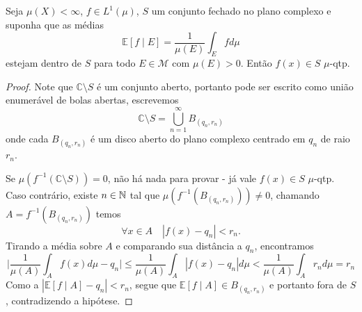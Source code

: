 \begin{problem}
    \label{prob:l6:2}
    Seja $\mu(X) < \infty$, $f \in L^1(\mu)$, $S$ um conjunto fechado no plano complexo e suponha que as médias
    $$\mathbb{E}[f \mid E] = \frac{1}{\mu(E)} \int_E fd\mu$$
    estejam dentro de $S$ para todo $E \in \mathcal{M}$ com $\mu(E) > 0$. Então $f(x) \in S$ $\mu$-qtp. 
\end{problem}
\begin{proof}
    Note que $\mathbb{C} \setminus S$ é um conjunto aberto, portanto pode ser escrito como união enumerável
    de bolas abertas, escrevemos
    $$\mathbb{C} \setminus S = \bigcup_{n=1}^{\infty} B_{(q_n, r_n)}$$
    onde cada $B_{(q_n,r_n)}$ é um disco aberto do plano complexo centrado em $q_n$ de raio $r_n$. 
    
    Se $\mu(f^{-1}(\mathbb{C} \setminus S)) = 0$, não há nada para provar - já vale $f(x) \in S$ $\mu$-qtp. Caso contrário,
    existe $n \in \mathbb{N}$ tal que $\mu(f^{-1}(B_{(q_n,r_n)})) \neq 0$, chamando $A = f^{-1}(B_{(q_n,r_n)})$ temos
    $$\forall x \in A \quad |f(x) - q_n| < r_n.$$ 
    Tirando a média sobre $A$ e comparando sua distância a $q_n$, encontramos
    $$\bigg | \frac{1}{\mu(A)} \int_A f(x) d\mu - q_n\bigg| \leq \frac{1}{\mu(A)} \int_A |f(x) - q_n| d\mu < \frac{1}{\mu(A)} \int_A r_n d\mu = r_n$$
    Como a $|\mathbb{E}[f \mid A] - q_n| < r_n$, segue que $\mathbb{E}[f \mid A] \in B_{(q_n,r_n)}$ e portanto fora de $S$, contradizendo a hipótese.
\end{proof}

